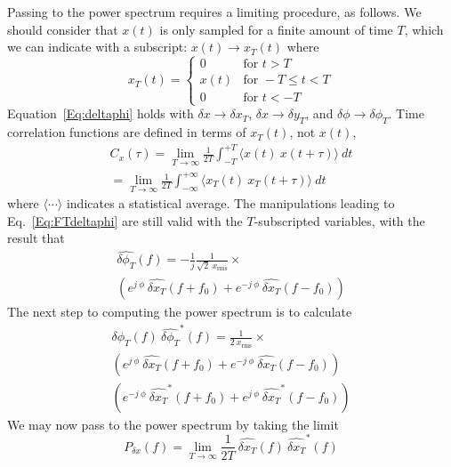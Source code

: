 \documentclass[twocolumn,pre,nobalancelastpage]{revtex4}
\begin{document}
Passing to the power spectrum requires a limiting procedure, as follows.  We should consider that $x(t)$ is only sampled for a finite amount of time $T$, which we can indicate with a subscript: $x(t) \rightarrow x_{T}(t)$ where
\begin{equation}
x_{T}(t) = \begin{cases}
0 & \text{for } t > T \\
x(t) & \text{for } -T \leq t < T \\
0 & \text{for } t < -T
\end{cases}
\label{Eq:xT}
\end{equation}
Equation~\ref{Eq:deltaphi} holds with $\delta x \rightarrow \delta x_T$, $\delta x \rightarrow \delta y_T$, and $\delta \phi \rightarrow \delta \phi_T$.  Time correlation functions are defined in terms of $x_T(t)$, not $x(t)$,
\begin{multline}
C_x(\tau) = \lim_{T \rightarrow \infty} \frac{1}{2 T}
\int_{-T}^{+T} \langle x(t) \: x(t + \tau) \rangle \: dt \\
= \lim_{T \rightarrow \infty} \frac{1}{2 T}
\int_{-\infty}^{+\infty} \langle x_{T}(t) \: x_{T}(t + \tau) \rangle \: dt
\end{multline}
where $\langle \cdots \rangle$ indicates a statistical average.  The manipulations leading to Eq.~\ref{Eq:FTdeltaphi} are still valid with the $T$-subscripted variables, with the result that
\begin{multline}
\widehat{\delta \phi_{T}}(f) = - \frac{1}{j} \frac{1}{\sqrt{2} \: x_{\text{rms}}} \times \\
\left( e^{j \: \phi} \: \widehat{\delta x_{T}}(f+f_0) + e^{-j \: \phi} \: \widehat{\delta x_{T}}(f-f_0) \right)
\label{Eq:FTdeltaphiT}
\end{multline}
The next step to computing the power spectrum is to calculate
\begin{multline}
\widehat{\delta \phi_{T}}(f) \: \widehat{\delta \phi_{T}}^{*}\!\!(f) =
 \frac{1}{2 \: x_{\text{rms}}} \times \\
 \left( e^{j \: \phi} \: \widehat{\delta x_{T}}(f+f_0)
  + e^{-j \: \phi} \: \widehat{\delta x_{T}}(f-f_0) \right) \\
 \left( e^{-j \: \phi} \: \widehat{\delta x_{T}}^{*}\!\!(f+f_0)
  + e^{j \: \phi} \: \widehat{\delta x_{T}}^{*}\!\!(f-f_0) \right)
  \label{Eq:PdeltaphiTintermediate}
\end{multline}
We may now pass to the power spectrum by taking the limit
\begin{equation}
P_{\delta x}(f) = \lim_{T \rightarrow \infty} \frac{1}{2 T} \:
 \widehat{\delta x_{T}}(f) \: \widehat{\delta x_{T}}^{*}\!\!(f)
\end{equation}
\end{document}
